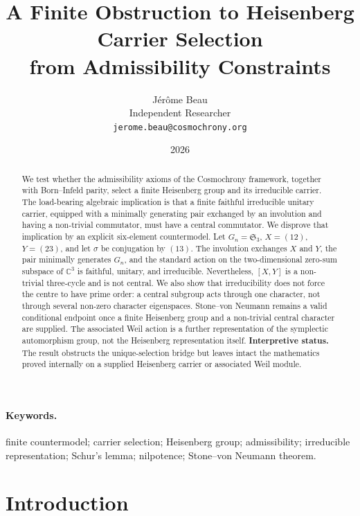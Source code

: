 \documentclass[11pt,a4paper]{article}
\title{A Finite Obstruction to Heisenberg Carrier Selection\\
from Admissibility Constraints}
\author{J\'er\^ome Beau\\
\small Independent Researcher\\
\small \texttt{jerome.beau@cosmochrony.org}}
\date{2026}
\newcommand{\Sym}{\mathfrak{S}}
\begin{document}
  \maketitle

  \begin{abstract}
    We test whether the admissibility axioms of the Cosmochrony framework,
    together with Born--Infeld parity, select a finite Heisenberg group and its
    irreducible carrier.
    The load-bearing algebraic implication is that a finite faithful irreducible
    unitary carrier, equipped with a minimally generating pair exchanged by an
    involution and having a non-trivial commutator, must have a central commutator.
    We disprove that implication by an explicit six-element countermodel.
    Let $G_n=\Sym_3$, $X=(12)$, $Y=(23)$, and let $\sigma$ be conjugation by $(13)$.
    The involution exchanges $X$ and $Y$, the pair minimally generates $G_n$, and
    the standard action on the two-dimensional zero-sum subspace of
    $\mathbb{C}^3$ is faithful, unitary, and irreducible.
    Nevertheless, $[X,Y]$ is a non-trivial three-cycle and is not central.
    We also show that irreducibility does not force the centre to have prime
    order: a central subgroup acts through one character, not through several
    non-zero character eigenspaces.
    Stone--von Neumann remains a valid conditional endpoint once a finite
    Heisenberg group and a non-trivial central character are supplied.
    The associated Weil action is a further representation of the symplectic
    automorphism group, not the Heisenberg representation itself.
    \textbf{Interpretive status.}
    The result obstructs the unique-selection bridge but leaves intact the
    mathematics proved internally on a supplied Heisenberg carrier or associated
    Weil module.
  \end{abstract}

  \paragraph{Keywords.}
    finite countermodel; carrier selection; Heisenberg group; admissibility;
    irreducible representation; Schur's lemma; nilpotence; Stone--von Neumann theorem.

    \clearpage
    \tableofcontents
    \clearpage

  \section{Introduction}
  \label{sec:intro}
\end{document}
